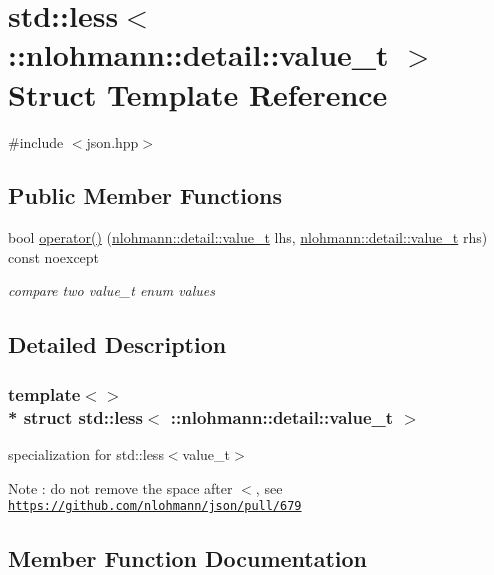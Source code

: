 \hypertarget{structstd_1_1less_3_01_1_1nlohmann_1_1detail_1_1value__t_01_4}{}\section{std\+:\+:less$<$ \+:\+:nlohmann\+:\+:detail\+:\+:value\+\_\+t $>$ Struct Template Reference}
\label{structstd_1_1less_3_01_1_1nlohmann_1_1detail_1_1value__t_01_4}


{\ttfamily \#include $<$json.\+hpp$>$}

\subsection*{Public Member Functions}
\begin{DoxyCompactItemize}
\item 
bool \hyperlink{structstd_1_1less_3_01_1_1nlohmann_1_1detail_1_1value__t_01_4_a76d2a6c170cfd74f3b1882be1b5a6671}{operator()} (\hyperlink{namespacenlohmann_1_1detail_a90aa5ef615aa8305e9ea20d8a947980f}{nlohmann\+::detail\+::value\+\_\+t} lhs, \hyperlink{namespacenlohmann_1_1detail_a90aa5ef615aa8305e9ea20d8a947980f}{nlohmann\+::detail\+::value\+\_\+t} rhs) const noexcept
\begin{DoxyCompactList}\small\item\em compare two value\+\_\+t enum values \end{DoxyCompactList}\end{DoxyCompactItemize}


\subsection{Detailed Description}
\subsubsection*{template$<$$>$\\*
struct std\+::less$<$ \+::nlohmann\+::detail\+::value\+\_\+t $>$}

specialization for std\+::less$<$value\+\_\+t$>$ \begin{DoxyNote}{Note}
\+: do not remove the space after \textquotesingle{}$<$\textquotesingle{}, see \href{https://github.com/nlohmann/json/pull/679}{\tt https\+://github.\+com/nlohmann/json/pull/679} 
\end{DoxyNote}


\subsection{Member Function Documentation}

